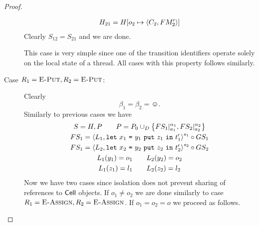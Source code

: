 \begin{proof}
\begin{description}
\begin{equation}
\begin{gathered}
          H_{21} = H[o_2 \mapsto \mbox{$\langle C_2, FM'_2 \rangle$}]
        \end{gathered}
      \end{equation}
      Clearly $S_{12} = S_{21}$ and we are done.
      \begin{remark}
        This case is very simple since one of the transition identifiers
        operate solely on the local state of a thread. All cases with this
        property follows similarly.
      \end{remark}
    \item[Case $R_1 = \mbox{{\sc E-Put}}, R_2 = \mbox{{\sc E-Put}}$:] Clearly
      \begin{equation*}
        \beta_1 = \beta_2 = \smiley.
      \end{equation*}
      Similarly to previous cases we have
      \begin{equation}
        \begin{gathered}
          S = H, P \quad\quad P = P_0 \cup_D \left\{ FS_1|_{a_1}^{\alpha_1},
          FS_2|_{a_2}^{\alpha_2} \right\} \\
          FS_1 = \mbox{$\langle L_1, \mbox{\mdseries\texttt{let}~$x_1$~\texttt{=}~$\mbox{\mdseries$y_1$~\texttt{put}~$z_1$}$~\texttt{in}~$t'_1$} \rangle$}^{s_1} \circ GS_1
          \\ 
          FS_1 = \mbox{$\langle L_2, \mbox{\mdseries\texttt{let}~$x_2$~\texttt{=}~$\mbox{\mdseries$y_2$~\texttt{put}~$z_2$}$~\texttt{in}~$t'_2$} \rangle$}^{s_2}
          \circ GS_2 \\
          L_1(y_1) = o_1 \quad\quad L_2(y_2) = o_2 \\
          L_1(z_1) = l_1 \quad\quad L_2(z_2) = l_2
        \end{gathered}
      \end{equation}
      Now we have two cases since isolation does not prevent sharing of
      references to $\mbox{$\mathsf{Cell}$}$ objects. If $o_1 \neq o_2$ we are done similarly
      to case $R_1 = \mbox{{\sc E-Assign}}, R_2 = \mbox{{\sc E-Assign}}$. If $o_1 = o_2 = o$ we proceed as
      follows.
      

\end{description}
\end{proof}
